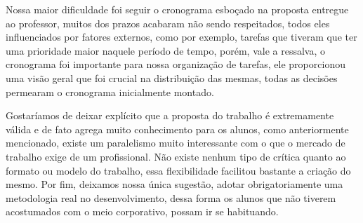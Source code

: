Nossa maior dificuldade foi seguir o cronograma esboçado na proposta entregue ao professor, muitos dos prazos acabaram não sendo respeitados, todos eles influenciados por fatores externos, como por exemplo, tarefas que tiveram que ter uma prioridade maior naquele período de tempo, porém, vale a ressalva, o cronograma foi importante para nossa organização de tarefas, ele proporcionou uma visão geral que foi crucial na distribuição das mesmas, todas as decisões permearam o cronograma inicialmente montado.

Gostaríamos de deixar explícito que a proposta do trabalho é extremamente válida e de fato agrega muito conhecimento para os alunos, como anteriormente mencionado, existe um paralelismo muito interessante com o que o mercado de trabalho exige de um profissional. Não existe nenhum tipo de crítica quanto ao formato ou modelo do trabalho, essa flexibilidade facilitou bastante a criação do mesmo. Por fim, deixamos nossa única sugestão, adotar obrigatoriamente uma metodologia real no desenvolvimento, dessa forma os alunos que não tiverem acostumados com o meio corporativo, possam ir se habituando.